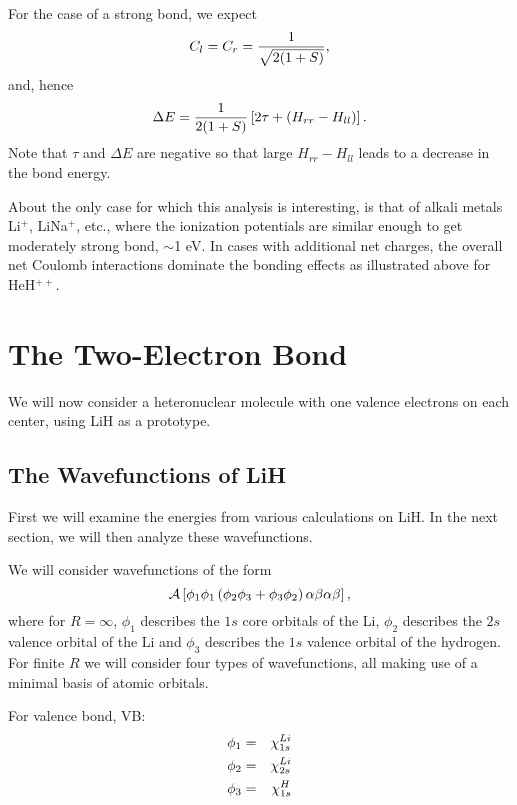 For the case of a strong bond, we expect
\begin{equation}
C_l = C_r = {1 \over \sqrt{2(1+S)}} ,
\end{equation}
and, hence
\begin{equation}
\Delta E = {1 \over 2(1+S)} \left[ 2 \tau + \left( H_{rr} - H_{ll} 
\right) \right] .
\end{equation}
Note that $\tau$ and $\Delta E$ are negative so that large $H_{rr} - 
H_{ll}$ leads to a decrease in the bond energy.

About the only case for which this analysis is interesting, is that of
alkali metals Li$^+$, LiNa$^+$, etc., where the ionization potentials are similar
enough to get moderately strong bond, $\sim$1 eV.  In cases with additional net
charges, the overall net Coulomb interactions dominate the bonding effects
as illustrated above for HeH$^{++}$.

\section{The Two-Electron Bond}

We will now consider a heteronuclear molecule with one valence 
electrons on each center, using LiH as a prototype.

\subsection{The Wavefunctions of LiH}

First we will examine the energies from various calculations on LiH.
In the next section, we will then analyze these wavefunctions.

We will consider wavefunctions of the form
\begin{equation}
{\cal A} \left[ \phi_1 \phi_1 \left( \phi_2 \phi_3 + \phi_3 \phi_2 
\right) \alpha \beta \alpha \beta \right] ,
\end{equation}
where for $R = \infty$, $\phi_1$ describes the $1s$ core orbitals of the 
Li, $\phi_2$ describes the $2s$ valence orbital of the Li and $\phi_3$ 
describes the $1s$ valence orbital of the hydrogen.  For finite $R$ we 
will consider four types of wavefunctions, all
making use of a minimal basis of atomic orbitals.

For valence bond, VB:
\begin{eqnarray}
\phi_1 &=& \chi^{Li}_{1s}\cr
\phi_2 &=& \chi^{Li}_{2s}\cr
\phi_3 &=& \chi^{H}_{1s}
\end{eqnarray}

